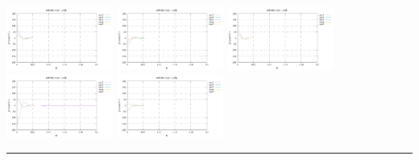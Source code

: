 \noindent
\includegraphics[width=3.5cm]{python_codes/fieldstone_152/RESULTS/exp1/qqq_128_m2}
\includegraphics[width=3.5cm]{python_codes/fieldstone_152/RESULTS/exp1/qqq_128_m3}
\includegraphics[width=3.5cm]{python_codes/fieldstone_152/RESULTS/exp1/qqq_128_m4}
\includegraphics[width=3.5cm]{python_codes/fieldstone_152/RESULTS/exp1/qqq_128_m5}
\includegraphics[width=3.5cm]{python_codes/fieldstone_152/RESULTS/exp1/qqq_128_m6}

\hrule

